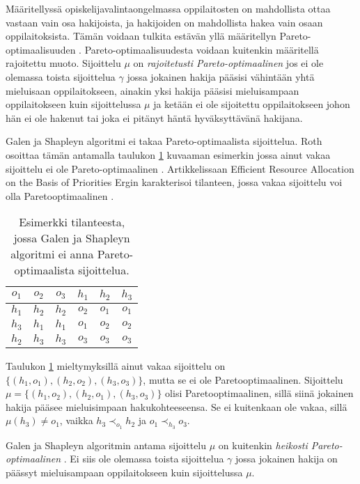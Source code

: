 \documentclass[twoside]{tktltiki}
\begin{document}
Määritellyssä opiskelijavalintaongelmassa oppilaitosten on mahdollista
ottaa vastaan vain osa hakijoista, ja hakijoiden on mahdollista hakea
vain osaan oppilaitoksista. Tämän voidaan tulkita estävän yllä
määritellyn Pareto-optimaalisuuden \cite{kojima10}.
Pareto-optimaalisuudesta voidaan kuitenkin määritellä rajoitettu
muoto. Sijoittelu $\mu$ on \emph{rajoitetusti Pareto-optimaalinen} jos
ei ole olemassa toista sijoittelua $\gamma$ jossa jokainen hakija
pääsisi vähintään yhtä mieluisaan oppilaitokseen, ainakin yksi hakija
pääsisi mieluisampaan oppilaitokseen kuin sijoittelussa $\mu$ ja
ketään ei ole sijoitettu oppilaitokseen johon hän ei ole hakenut tai
joka ei pitänyt häntä hyväksyttävänä hakijana.

Galen ja Shapleyn algoritmi ei takaa Pareto-optimaalista sijoittelua.
Roth osoittaa tämän antamalla taulukon \ref{roth_optimaalisuus}
kuvaaman esimerkin jossa ainut vakaa sijoittelu ei ole
Pareto-optimaalinen \cite{roth82}. Artikkelissaan Efficient Resource
Allocation on the Basis of Priorities Ergin karakterisoi tilanteen,
jossa vakaa sijoittelu voi olla Pareto\hyph optimaalinen
\cite{ergin02}.

\begin{table}[ht]
  \begin{center}
    \begin{tabular}{ c c c | c c c }
      $o_1$ & $o_2$ & $o_3$ & $h_1$ & $h_2$ & $h_3$ \\
      \hline
      $h_1$ & $h_2$ & $h_2$ & $o_2$ & $o_1$ & $o_1$ \\
      $h_3$ & $h_1$ & $h_1$ & $o_1$ & $o_2$ & $o_2$ \\
      $h_2$ & $h_3$ & $h_3$ & $o_3$ & $o_3$ & $o_3$
    \end{tabular}
    \caption{Esimerkki tilanteesta, jossa Galen ja Shapleyn algoritmi ei
      anna Pareto-optimaalista sijoittelua.}
    \label{roth_optimaalisuus}
  \end{center}
\end{table}

Taulukon \ref{roth_optimaalisuus} mieltymyksillä ainut vakaa
sijoittelu on $\{(h_1, o_1), (h_2, o_2), (h_3, o_3)\}$, mutta se ei
ole Pareto\hyph optimaalinen. Sijoittelu $\mu = \{(h_1, o_2), (h_2,
o_1), (h_3, o_3)\}$ olisi Pareto\hyph optimaalinen, sillä siinä
jokainen hakija pääsee mieluisimpaan hakukohteeseensa. Se ei
kuitenkaan ole vakaa, sillä $\mu(h_3) \neq o_1$, vaikka $h_3
\prec_{o_1} h_2$ ja $o_1 \prec_{h_3} o_3$.

Galen ja Shapleyn algoritmin antama sijoittelu $\mu$ on kuitenkin
\emph{heikosti Pareto-optimaalinen} \cite{gusfield89}. Ei siis ole
olemassa toista sijoittelua $\gamma$ jossa jokainen hakija on päässyt
mieluisampaan oppilaitokseen kuin sijoittelussa $\mu$.
\end{document}

